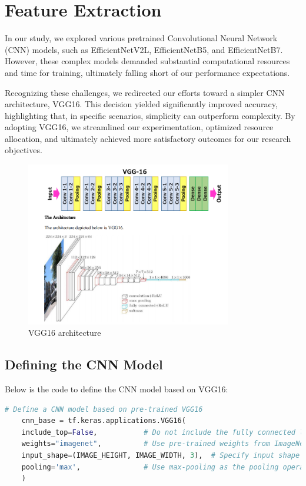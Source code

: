 \section{Feature Extraction}

In our study, we explored various pretrained Convolutional Neural Network (CNN) models, such as EfficientNetV2L, 
EfficientNetB5, and EfficientNetB7. However, these complex models demanded substantial computational resources 
and time for training, ultimately falling short of our performance expectations.

Recognizing these challenges, we redirected our efforts toward a simpler CNN architecture, VGG16. This decision 
yielded significantly improved accuracy, highlighting that, in specific scenarios, simplicity can outperform 
complexity. By adopting VGG16, we streamlined our experimentation, optimized resource allocation, and ultimately 
achieved more satisfactory outcomes for our research objectives.

\begin{figure}[H]
    \centering
    \includegraphics[width= 0.8\textwidth]{assets/VGG16.png} 
    \caption{VGG16 architecture} 
    \label{fig:immagine}
\end{figure}

\subsection{Defining the CNN Model}

Below is the code to define the CNN model based on VGG16:

\begin{lstlisting}[language=Python]
	# Define a CNN model based on pre-trained VGG16
	cnn_base = tf.keras.applications.VGG16(
	include_top=False,           # Do not include the fully connected layer on top of the model
	weights="imagenet",          # Use pre-trained weights from ImageNet
	input_shape=(IMAGE_HEIGHT, IMAGE_WIDTH, 3),  # Specify input shape (height, width, channels)
	pooling='max',               # Use max-pooling as the pooling operation
	)
\end{lstlisting}

